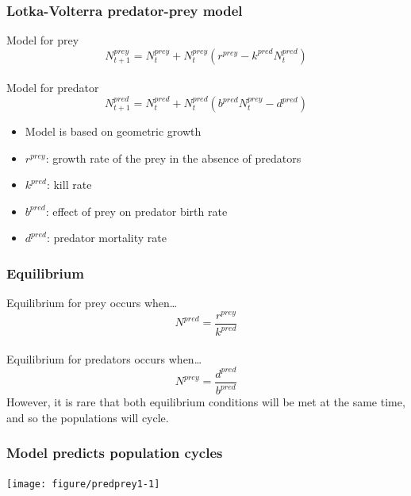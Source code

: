 \documentclass[color=usenames,dvipsnames]{beamer}\usepackage[]{graphicx}\usepackage[]{xcolor}
\begin{document}
\begin{frame}
  \frametitle{Lotka-Volterra predator-prey model}
  \Large
  Model for prey
  \[
    N^{prey}_{t+1} = N^{prey}_t + N^{prey}_t (r^{prey} - k^{pred} N^{pred}_t)
  \] \\
  \vspace{1cm}
  \pause
  Model for predator
  \[
    N^{pred}_{t+1} = N^{pred}_t + N^{pred}_t (b^{pred}N^{prey}_t - d^{pred})
  \]
  \pause
  \vfill
  \normalsize
  \begin{itemize}
    \item Model is based on geometric growth
    \item $r^{prey}$: growth rate of the prey in the absence of
      predators
    \item $k^{pred}$: kill rate
    \item $b^{pred}$: effect of prey on predator birth rate
    \item $d^{pred}$: predator mortality rate
  \end{itemize}
\end{frame}



\begin{frame}
  \frametitle{Equilibrium}
  \Large
  Equilibrium for prey occurs when\dots
  \[
    N^{pred} = \frac{r^{prey}}{k^{pred}}
  \] \\
  \vspace{1cm}
  \pause
  Equilibrium for predators occurs when\dots
  \[
    N^{prey} = \frac{d^{pred}}{b^{pred}}
  \]
  \pause
  \vfill
  \large
  However, it is rare that both equilibrium conditions will be met at
  the same time, and so the populations will cycle.
\end{frame}



\begin{frame}[fragile]
  \frametitle{Model predicts population cycles}
\vspace{-1.2cm}

\begin{center}
  \texttt{[image: figure/predprey1-1]}
\end{center}
\end{frame}
\end{document}
